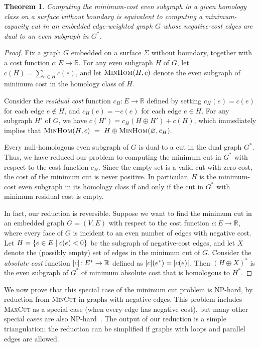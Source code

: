 \documentclass{sig-alternate}
\def\Real{\mathbb{R}}
\newtheorem{theorem}{Theorem}[section]
\begin{document}
\begin{theorem}
Computing the minimum-cost even subgraph in a given homology class on a surface without boundary is equivalent to computing a minimum-capacity cut in an embedded edge-weighted graph $G$ whose negative-cost edges are dual to an even subgraph in $G^*$.
\end{theorem}

\begin{proof}
Fix a graph $G$ embedded on a surface $\Sigma$ without boundary, together with a cost function $c\colon E\to \Real$.  For any even subgraph $H$ of $G$, let $c(H) = \sum_{e\in H} c(e)$, and let $\textsc{MinHom}(H,c)$ denote the even subgraph of minimum cost in the homology class of $H$.

Consider the \emph{residual cost} function $c_H\colon E\to \Real$ defined by setting $c_H(e) = c(e)$ for each edge $e\not\in H$, and $c_H(e) = -c(e)$ for each edge $e\in H$.  For any subgraph $H'$ of $G$, we have $c(H') = c_H(H\oplus H') + c(H)$, which immediately implies that
\(
    \textsc{MinHom}(H,c) ~=~
    H \oplus \textsc{MinHom}(\varnothing, c_H).
\)

Every null-homologous even subgraph of $G$ is dual to a cut in the dual graph $G^*$.  Thus, we have reduced our problem to computing the minimum cut in $G^*$ with respect to the cost function $c_H$.  Since the empty set is a valid cut with zero cost, the cost of the minimum cut is never positive.  In particular, $H$ is the minimum-cost even subgraph in its homology class if and only if the cut in $G^*$ with minimum residual cost is empty.

In fact, our reduction is reversible.  Suppose we want to find the minimum cut in an embedded graph $G = (V, E)$ with respect to the cost function $c\colon E\to \Real$, where every face of $G$ is incident to an even number of edges with negative cost.  Let $H = \{ {e\in E}\mid {c(e)<0} \}$ be the subgraph of negative-cost edges, and let $X$ denote the (possibly empty) set of edges in the minimum cut of $G$.  Consider the \emph{absolute cost} function $\abs{c}\colon E^*\to \Real$ defined as $\mathopen| c \mathclose|(e^*) = \mathopen| c(e) \mathclose|$.  Then $(H\oplus X)^*$ is the even subgraph of $G^*$ of minimum absolute cost that is homologous to $H^*$.
\end{proof}

We now prove that this special case of the minimum cut problem is {NP}-hard, by  reduction from \textsc{MinCut} in graphs with negative edges.  This problem includes \textsc{MaxCut} as a special case (when every edge has negative cost), but many other special cases are also {NP}-hard~\cite{mrr-edofm-03}.  The output of our reduction is a simple triangulation; the reduction can be simplified if graphs with loops and parallel edges are allowed.
\end{document}
